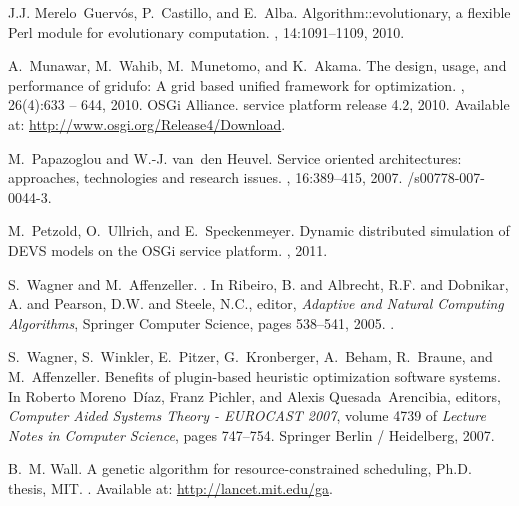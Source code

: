 \documentclass{sig-alternate}
\begin{document}
\begin{thebibliography}{10}
J.J. Merelo~Guerv\'os, P.~Castillo, and E.~Alba.
\newblock Algorithm::evolutionary, a flexible {P}erl module for evolutionary
  computation.
, 14:1091--1109, 2010.

A.~Munawar, M.~Wahib, M.~Munetomo, and K.~Akama.
\newblock The design, usage, and performance of gridufo: A grid based unified
  framework for optimization.
, 26(4):633 -- 644, 2010.
\vfill\eject
{}
{OSGi Alliance}.
 service platform release 4.2, 2010.
\newblock Available at: \url{http://www.osgi.org/Release4/Download}.

M.~Papazoglou and W.-J. van~den Heuvel.
\newblock Service oriented architectures: approaches, technologies and research
  issues.
, 16:389--415, 2007.
/s00778-007-0044-3.

M.~Petzold, O.~Ullrich, and E.~Speckenmeyer.
\newblock Dynamic distributed simulation of {DEVS} models on the {OSGi} service
  platform.
, 2011.

S.~Wagner and M.~Affenzeller.
.
\newblock In {Ribeiro, B. and Albrecht, R.F. and Dobnikar, A. and Pearson, D.W.
  and Steele, N.C.}, editor, {\em {Adaptive and Natural Computing Algorithms}},
  {Springer Computer Science}, pages {538--541}, {2005}.
.

S.~Wagner, S.~Winkler, E.~Pitzer, G.~Kronberger, A.~Beham, R.~Braune, and
  M.~Affenzeller.
\newblock Benefits of plugin-based heuristic optimization software systems.
\newblock In Roberto Moreno~D{\'i}az, Franz Pichler, and Alexis
  Quesada~Arencibia, editors, {\em Computer Aided Systems Theory - EUROCAST
  2007}, volume 4739 of {\em Lecture Notes in Computer Science}, pages
  747--754. Springer Berlin / Heidelberg, 2007.

B.~M. Wall.
\newblock A genetic algorithm for resource-constrained scheduling, {Ph.D}.
  thesis, {MIT}.
.
\newblock Available at: \url{http://lancet.mit.edu/ga}.

\end{thebibliography}
\end{document}
